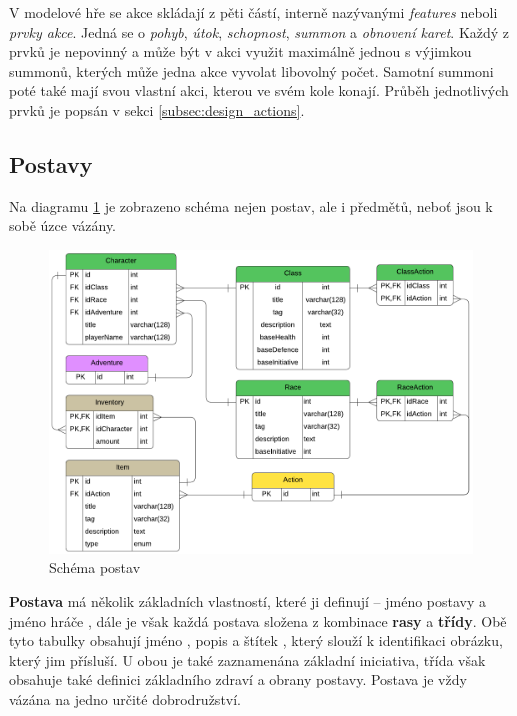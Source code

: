 V modelové hře se akce skládají z pěti částí, interně nazývanými \textit{features} neboli \textit{prvky akce}. Jedná se o \textit{pohyb}, \textit{útok}, \textit{schopnost}, \textit{summon} a \textit{obnovení karet}. Každý z prvků je nepovinný a může být v akci využit maximálně jednou s výjimkou summonů, kterých může jedna akce vyvolat libovolný počet. Samotní summoni poté také mají svou vlastní akci, kterou ve svém kole konají. Průběh jednotlivých prvků je popsán v sekci \ref{subsec:design_actions}.


\subsection{Postavy}
\label{subsec:schema_character}

Na diagramu \ref{diag:er_character} je zobrazeno schéma nejen postav, ale i předmětů, neboť jsou k sobě úzce vázány. 

\begin{figure}[h]
    \centering
    \includegraphics[width=\textwidth]{../../shared/diagrams/er_character.pdf}
    \caption{Schéma postav}
    \label{diag:er_character}
\end{figure}

\textbf{Postava}  má několik základních vlastností, které ji definují -- jméno postavy  a jméno hráče , dále je však každá postava složena z kombinace \textbf{rasy} a \textbf{třídy}. Obě tyto tabulky obsahují jméno , popis  a štítek , který slouží k identifikaci obrázku, který jim přísluší. U obou je také zaznamenána základní iniciativa, třída však obsahuje také definici základního zdraví a obrany postavy. Postava je vždy vázána na jedno určité dobrodružství.

